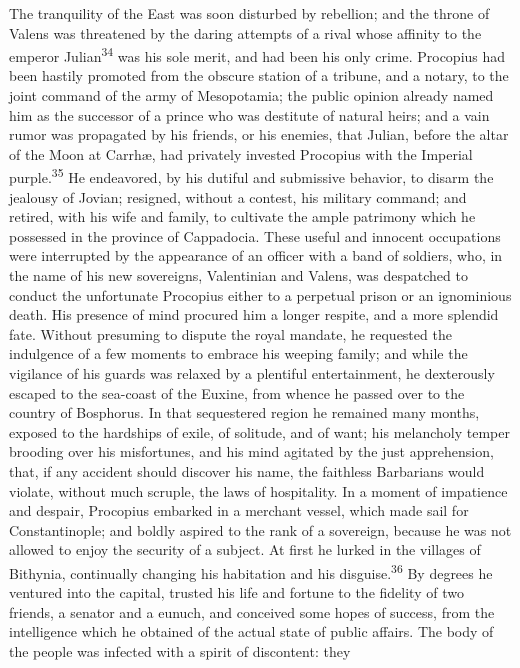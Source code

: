 The tranquility of the East was soon disturbed by rebellion; and
the throne of Valens was threatened by the daring attempts of a
rival whose affinity to the emperor Julian\textsuperscript{34} was his sole merit,
and had been his only crime. Procopius had been hastily promoted
from the obscure station of a tribune, and a notary, to the joint
command of the army of Mesopotamia; the public opinion already
named him as the successor of a prince who was destitute of
natural heirs; and a vain rumor was propagated by his friends, or
his enemies, that Julian, before the altar of the Moon at Carrhæ,
had privately invested Procopius with the Imperial purple.\textsuperscript{35} He
endeavored, by his dutiful and submissive behavior, to disarm the
jealousy of Jovian; resigned, without a contest, his military
command; and retired, with his wife and family, to cultivate the
ample patrimony which he possessed in the province of Cappadocia.
These useful and innocent occupations were interrupted by the
appearance of an officer with a band of soldiers, who, in the
name of his new sovereigns, Valentinian and Valens, was
despatched to conduct the unfortunate Procopius either to a
perpetual prison or an ignominious death. His presence of mind
procured him a longer respite, and a more splendid fate. Without
presuming to dispute the royal mandate, he requested the
indulgence of a few moments to embrace his weeping family; and
while the vigilance of his guards was relaxed by a plentiful
entertainment, he dexterously escaped to the sea-coast of the
Euxine, from whence he passed over to the country of Bosphorus.
In that sequestered region he remained many months, exposed to
the hardships of exile, of solitude, and of want; his melancholy
temper brooding over his misfortunes, and his mind agitated by
the just apprehension, that, if any accident should discover his
name, the faithless Barbarians would violate, without much
scruple, the laws of hospitality. In a moment of impatience and
despair, Procopius embarked in a merchant vessel, which made sail
for Constantinople; and boldly aspired to the rank of a
sovereign, because he was not allowed to enjoy the security of a
subject. At first he lurked in the villages of Bithynia,
continually changing his habitation and his disguise.\textsuperscript{36} By
degrees he ventured into the capital, trusted his life and
fortune to the fidelity of two friends, a senator and a eunuch,
and conceived some hopes of success, from the intelligence which
he obtained of the actual state of public affairs. The body of
the people was infected with a spirit of discontent: they
